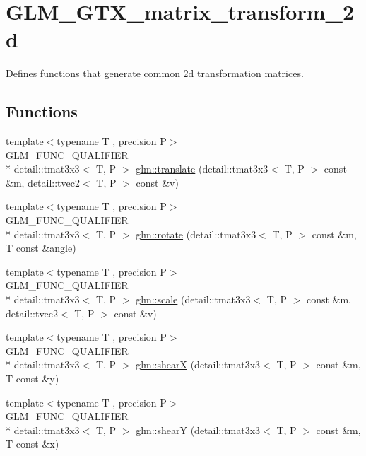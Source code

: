 \hypertarget{group__gtx__matrix__transform__2d}{\section{G\-L\-M\-\_\-\-G\-T\-X\-\_\-matrix\-\_\-transform\-\_\-2d}
\label{group__gtx__matrix__transform__2d}
}


Defines functions that generate common 2d transformation matrices.  


\subsection*{Functions}
\begin{DoxyCompactItemize}
\item 
{\footnotesize template$<$typename T , precision P$>$ }\\G\-L\-M\-\_\-\-F\-U\-N\-C\-\_\-\-Q\-U\-A\-L\-I\-F\-I\-E\-R \\*
detail\-::tmat3x3$<$ T, P $>$ \hyperlink{group__gtx__matrix__transform__2d_gaa73c0e940e66b4e8aebf9dc72f5a7e34}{glm\-::translate} (detail\-::tmat3x3$<$ T, P $>$ const \&m, detail\-::tvec2$<$ T, P $>$ const \&v)
\item 
{\footnotesize template$<$typename T , precision P$>$ }\\G\-L\-M\-\_\-\-F\-U\-N\-C\-\_\-\-Q\-U\-A\-L\-I\-F\-I\-E\-R \\*
detail\-::tmat3x3$<$ T, P $>$ \hyperlink{group__gtx__matrix__transform__2d_gae172cd1e33a5c7b82c69a9731eac6c67}{glm\-::rotate} (detail\-::tmat3x3$<$ T, P $>$ const \&m, T const \&angle)
\item 
{\footnotesize template$<$typename T , precision P$>$ }\\G\-L\-M\-\_\-\-F\-U\-N\-C\-\_\-\-Q\-U\-A\-L\-I\-F\-I\-E\-R \\*
detail\-::tmat3x3$<$ T, P $>$ \hyperlink{group__gtx__matrix__transform__2d_gaf17588e16120250980b221c2ebdde0eb}{glm\-::scale} (detail\-::tmat3x3$<$ T, P $>$ const \&m, detail\-::tvec2$<$ T, P $>$ const \&v)
\item 
{\footnotesize template$<$typename T , precision P$>$ }\\G\-L\-M\-\_\-\-F\-U\-N\-C\-\_\-\-Q\-U\-A\-L\-I\-F\-I\-E\-R \\*
detail\-::tmat3x3$<$ T, P $>$ \hyperlink{group__gtx__matrix__transform__2d_gaeac73f42bba3e35100d9a43c40dc0f23}{glm\-::shear\-X} (detail\-::tmat3x3$<$ T, P $>$ const \&m, T const \&y)
\item 
{\footnotesize template$<$typename T , precision P$>$ }\\G\-L\-M\-\_\-\-F\-U\-N\-C\-\_\-\-Q\-U\-A\-L\-I\-F\-I\-E\-R \\*
detail\-::tmat3x3$<$ T, P $>$ \hyperlink{group__gtx__matrix__transform__2d_ga04dd04815c1c8ee0bd49e6ae499d8252}{glm\-::shear\-Y} (detail\-::tmat3x3$<$ T, P $>$ const \&m, T const \&x)
\end{DoxyCompactItemize}


